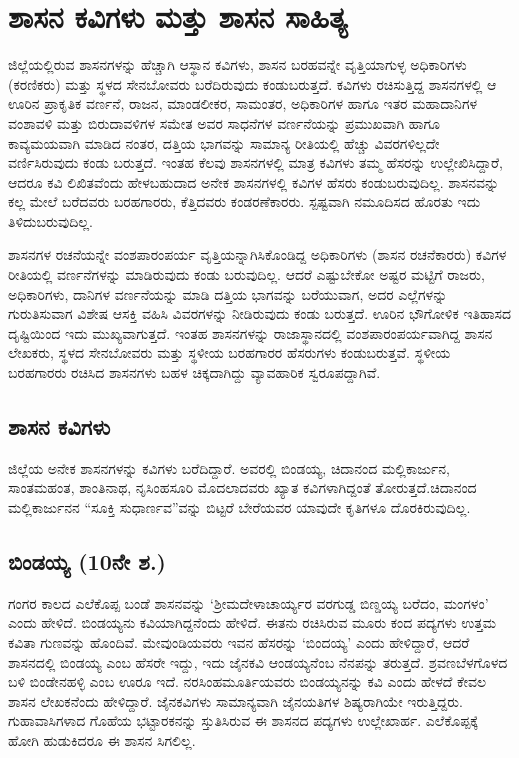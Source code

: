 
\chapter{ಶಾಸನ ಕವಿಗಳು ಮತ್ತು ಶಾಸನ ಸಾಹಿತ್ಯ}

ಜಿಲ್ಲೆಯಲ್ಲಿರುವ ಶಾಸನಗಳನ್ನು ಹೆಚ್ಚಾಗಿ ಆಸ್ಥಾನ ಕವಿಗಳು, ಶಾಸನ ಬರಹವನ್ನೇ ವೃತ್ತಿಯಾಗುಳ್ಳ ಅಧಿಕಾರಿಗಳು (ಕರಣಿಕರು) ಮತ್ತು ಸ್ಥಳದ ಸೇನಬೋವರು ಬರೆದಿರುವುದು ಕಂಡುಬರುತ್ತದೆ. ಕವಿಗಳು ರಚಿಸುತ್ತಿದ್ದ ಶಾಸನಗಳಲ್ಲಿ ಆ ಊರಿನ ಪ್ರಾಕೃತಿಕ ವರ್ಣನೆ, ರಾಜನ, ಮಾಂಡಲೀಕರ, ಸಾಮಂತರ, ಅಧಿಕಾರಿಗಳ ಹಾಗೂ ಇತರ ಮಹಾದಾನಿಗಳ ವಂಶಾವಳಿ ಮತ್ತು ಬಿರುದಾವಳಿಗಳ ಸಮೇತ ಅವರ ಸಾಧನೆಗಳ ವರ್ಣನೆಯನ್ನು ಪ್ರಮುಖವಾಗಿ ಹಾಗೂ ಕಾವ್ಯಮಯವಾಗಿ ಮಾಡಿದ ನಂತರ, ದತ್ತಿಯ ಭಾಗವನ್ನು ಸಾಮಾನ್ಯ ರೀತಿಯಲ್ಲಿ ಹೆಚ್ಚು ವಿವರಗಳಿಲ್ಲದೇ ವರ್ಣಿಸಿರುವುದು ಕಂಡು ಬರುತ್ತದೆ. ಇಂತಹ ಕೆಲವು ಶಾಸನಗಳಲ್ಲಿ ಮಾತ್ರ ಕವಿಗಳು ತಮ್ಮ ಹೆಸರನ್ನು ಉಲ್ಲೇಖಿಸಿದ್ದಾರೆ, ಆದರೂ ಕವಿ ಲಿಖಿತವೆಂದು ಹೇಳಬಹುದಾದ ಅನೇಕ ಶಾಸನಗಳಲ್ಲಿ ಕವಿಗಳ ಹೆಸರು ಕಂಡುಬರುವುದಿಲ್ಲ. ಶಾಸನವನ್ನು ಕಲ್ಲ ಮೇಲೆ ಬರೆದವರು ಬರಹಗಾರರು, ಕೆತ್ತಿದವರು ಕಂಡರಣೆಕಾರರು. ಸ್ಪಷ್ಟವಾಗಿ ನಮೂದಿಸದ ಹೊರತು ಇದು ತಿಳಿದುಬರುವುದಿಲ್ಲ.

ಶಾಸನಗಳ ರಚನೆಯನ್ನೇ ವಂಶಪಾರಂಪರ್ಯ ವೃತ್ತಿಯನ್ನಾಗಿಸಿಕೊಂಡಿದ್ದ ಅಧಿಕಾರಿಗಳು (ಶಾಸನ ರಚನೆಕಾರರು) ಕವಿಗಳ ರೀತಿಯಲ್ಲಿ ವರ್ಣನೆಗಳನ್ನು ಮಾಡಿರುವುದು ಕಂಡು ಬರುವುದಿಲ್ಲ. ಆದರೆ ಎಷ್ಟುಬೇಕೋ ಅಷ್ಟರ ಮಟ್ಟಿಗೆ ರಾಜರು, ಅಧಿಕಾರಿಗಳು, ದಾನಿಗಳ ವರ್ಣನೆಯನ್ನು ಮಾಡಿ ದತ್ತಿಯ ಭಾಗವನ್ನು ಬರೆಯುವಾಗ, ಅದರ ಎಲ್ಲೆಗಳನ್ನು ಗುರುತಿಸುವಾಗ ವಿಶೇಷ ಆಸಕ್ತಿ ವಹಿಸಿ ವಿವರಗಳನ್ನು ನೀಡಿರುವುದು ಕಂಡು ಬರುತ್ತದೆ. ಊರಿನ ಭೌಗೋಳಿಕ ಇತಿಹಾಸದ ದೃಷ್ಟಿಯಿಂದ ಇದು ಮುಖ್ಯವಾಗುತ್ತದೆ. ಇಂತಹ ಶಾಸನಗಳನ್ನು ರಾಜಾಸ್ಥಾನದಲ್ಲಿ ವಂಶಪಾರಂಪರ್ಯವಾಗಿದ್ದ ಶಾಸನ ಲೇಖಕರು, ಸ್ಥಳದ ಸೇನಬೋವರು ಮತ್ತು ಸ್ಥಳೀಯ ಬರಹಗಾರರ ಹೆಸರುಗಳು ಕಂಡು\-ಬರುತ್ತವೆ. ಸ್ಥಳೀಯ ಬರಹಗಾರರು ರಚಿಸಿದ ಶಾಸನಗಳು ಬಹಳ ಚಿಕ್ಕದಾಗಿದ್ದು ವ್ಯಾವಹಾರಿಕ ಸ್ವರೂಪದ್ದಾಗಿವೆ.

\section{ಶಾಸನ ಕವಿಗಳು}

ಜಿಲ್ಲೆಯ ಅನೇಕ ಶಾಸನಗಳನ್ನು ಕವಿಗಳು ಬರೆದಿದ್ದಾರೆ. ಅವರಲ್ಲಿ ಬಿಂಡಯ್ಯ, ಚಿದಾನಂದ ಮಲ್ಲಿಕಾರ್ಜುನ, ಸಾಂತಮಹಂತ, ಶಾಂತಿನಾಥ, ನೃಸಿಂಹಸೂರಿ ಮೊದಲಾದವರು ಖ್ಯಾತ ಕವಿಗಳಾಗಿದ್ದಂತೆ ತೋರುತ್ತದೆ.\break ಚಿದಾನಂದ ಮಲ್ಲಿಕಾರ್ಜುನನ “ಸೂಕ್ತಿ ಸುಧಾರ್ಣವ”ವನ್ನು ಬಿಟ್ಟರೆ ಬೇರೆಯವರ ಯಾವುದೇ ಕೃತಿಗಳೂ ದೊರಕಿರುವುದಿಲ್ಲ.


\section{ಬಿಂಡಯ್ಯ (10ನೇ ಶ.)}

ಗಂಗರ ಕಾಲದ ಎಲೆಕೊಪ್ಪ ಬಂಡೆ ಶಾಸನವನ್ನು ‘ಶ‍್ರೀಮದೇಳಾಚಾರ್ಯ್ಯರ ವರಗುಡ್ಡ ಬಿಣ್ಡಯ್ಯ ಬರೆದಂ, ಮಂಗಳಂ’ ಎಂದು ಹೇಳಿದೆ. ಬಿಂಡಯ್ಯನು ಕವಿಯಾಗಿದ್ದನೆಂದು ಹೇಳಿದೆ. ಈತನು ರಚಿಸಿರುವ ಮೂರು ಕಂದ ಪದ್ಯಗಳು ಉತ್ತಮ ಕವಿತಾ ಗುಣವನ್ನು ಹೊಂದಿವೆ. ಮೇವುಂಡಿಯವರು ಇವನ ಹೆಸರನ್ನು ‘ಬಿಂದಯ್ಯ’ ಎಂದು ಹೇಳಿದ್ದಾರೆ, ಆದರೆ ಶಾಸನದಲ್ಲಿ ಬಿಂಡಯ್ಯ ಎಂಬ ಹೆಸರೇ ಇದ್ದು, ಇದು ಜೈನಕವಿ ಆಂಡಯ್ಯನೆಂಬ ನೆನಪನ್ನು ತರುತ್ತದೆ. ಶ್ರವಣಬೆಳಗೊಳದ ಬಳಿ ಬಿಂಡೇನಹಳ್ಳಿ ಎಂಬ ಊರೂ ಇದೆ. ನರಸಿಂಹಮೂರ್ತಿಯವರು ಬಿಂಡಯ್ಯನನ್ನು ಕವಿ ಎಂದು ಹೇಳದೆ ಕೇವಲ ಶಾಸನ ಲೇಖಕನೆಂದು ಹೇಳಿದ್ದಾರೆ. ಜೈನಕವಿಗಳು ಸಾಮಾನ್ಯವಾಗಿ ಜೈನಯತಿಗಳ ಶಿಷ್ಯರಾಗಿಯೇ ಇರುತ್ತಿದ್ದರು. ಗುಹಾವಾಸಿಗಳಾದ ಗೊಹೆಯ ಭಟ್ಟಾರಕನನ್ನು ಸ್ತುತಿಸಿರುವ ಈ ಶಾಸನದ ಪದ್ಯಗಳು ಉಲ್ಲೇಖಾರ್ಹ. ಎಲೆಕೊಪ್ಪಕ್ಕೆ ಹೋಗಿ ಹುಡುಕಿದರೂ ಈ ಶಾಸನ ಸಿಗಲಿಲ್ಲ.

